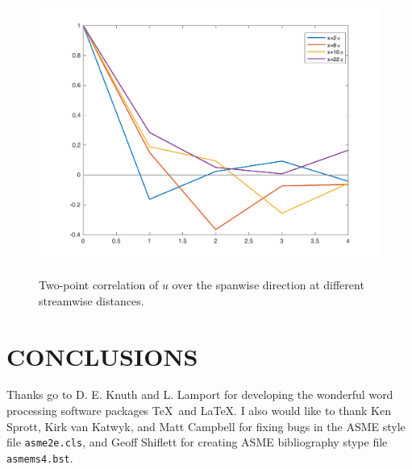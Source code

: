 \documentclass[twocolumn,10pt]{asme2e}
\begin{document}
\begin{figure}[t]
\centering
\scalebox{0.5}
{\includegraphics{spanwise_correlation.pdf}}
\caption{Two-point correlation of \(u\) over the spanwise direction at different streamwise distances.}
\label{fig:spanwise_correlation}
\end{figure}

\section*{CONCLUSIONS}


\begin{acknowledgment}
Thanks go to D. E. Knuth and L. Lamport for developing the wonderful word processing software packages \TeX\ and \LaTeX. I also would like to thank Ken Sprott, Kirk van Katwyk, and Matt Campbell for fixing bugs in the ASME style file \verb+asme2e.cls+, and Geoff Shiflett for creating 
ASME bibliography stype file \verb+asmems4.bst+.
\end{acknowledgment}




\appendix   
\end{document}
